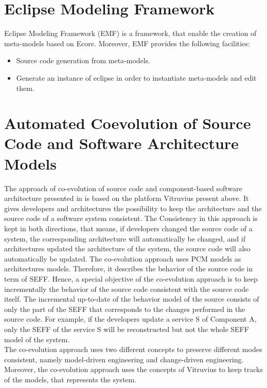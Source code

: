 \section{Eclipse Modeling Framework}
\label{sec:Eclipse Modeling Framework}
Eclipse Modeling Framework (EMF) is a framework, that enable the creation of meta-models based on Ecore. Moreover, EMF provides the following facilities:
\begin{itemize}
\item Source code generation from meta-models. 
\item Generate an instance of eclipse in order to instantiate meta-models and edit them.
\end{itemize}

\section{Automated Coevolution of Source Code and Software Architecture Models}
\label{sec:Automated Coevolution of Source Code and Software Architecture Models}
The approach of co-evolution of source code and component-based software architecture presented in \cite{langhammer2015co, langhammer2017automated} is based on the platform Vitruvius present above. It gives developers and architectures the possibility to keep the architecture and the source code of a software system consistent. The Consistency in this approach is kept in both directions, that means, if developers changed the source code of a system, the corresponding architecture will automatically be changed, and if architectures updated the architecture of the system, the source code will also automatically be updated. The co-evolution approach uses PCM models as architectures models.  Therefore, it describes the behavior of the source code in term of SEFF. Hence, a special objective of the co-evolution approach is to keep incrementally the behavior of the source code consistent with the source code itself. The incremental up-to-date of the behavior model of the source consists of only the part of the SEFF that corresponds to the changes performed in the source code. For example, if the developers update a service S of Component A, only the SEFF of the service S will be reconstructed but not the whole SEFF model of the system. \\

The co-evolution approach uses two different concepts to preserve different modes consistent, namely model-driven engineering and change-driven engineering. Moreover, the co-evolution approach uses the concepts of Vitruvius to keep tracks of the models, that represents the system. \\

